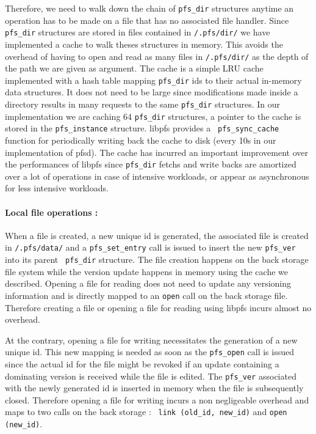 Therefore, we need to walk down the chain of {\tt pfs\_dir} structures
anytime an operation has to be made on a file that has no associated
file handler. Since {\tt pfs\_dir} structures are stored in files
contained in {\tt /.pfs/dir/} we have implemented a cache to walk
theses structures in memory. This avoids the overhead of having to
open and read as many files in {\tt /.pfs/dir/} as the depth of the
path we are given as argument. The cache is a simple LRU cache
implemented with a hash table mapping {\tt pfs\_dir} ids to their
actual in-memory data structures. It does not need to be large since
modifications made inside a directory results in many requests to the
same {\tt pfs\_dir} structures. In our implementation we are caching
64 {\tt pfs\_dir} structures, a pointer to the cache is stored in the
{\tt pfs\_instance} structure. libpfs provides a {\tt
  pfs\_sync\_cache} function for periodically writing back the cache
to disk (every 10s in our implementation of pfsd). The cache has
incurred an important improvement over the performances of libpfs
since {\tt pfs\_dir} fetchs and write backs are amortized over a lot
of operations in case of intensive workloads, or appear as
asynchronous for less intensive workloads.

\paragraph{Local file operations :}
When a file is created, a new unique id is generated, the associated
file is created in {\tt /.pfs/data/} and a {\tt pfs\_set\_entry} call
is issued to insert the new {\tt pfs\_ver} into its parent {\tt
  pfs\_dir} structure. The file creation happens on the back storage
file system while the version update happens in memory using the cache
we described. Opening a file for reading does not need to update any
versioning information and is directly mapped to an {\tt open} call on
the back storage file. Therefore creating a file or opening a file for
reading using libpfs incurs almost no overhead.

At the contrary, opening a file for writing necessitates the
generation of a new unique id. This new mapping is needed as soon as
the {\tt pfs\_open} call is issued since the actual id for the file
might be revoked if an update containing a dominating version is
received while the file is edited. The {\tt pfs\_ver} associated with
the newly generated id is inserted in memory when the file is
subsequently closed. Therefore opening a file for writing incurs a non
negligeable overhead and maps to two calls on the back storage : {\tt
  link (old\_id, new\_id)} and {\tt open (new\_id)}.

